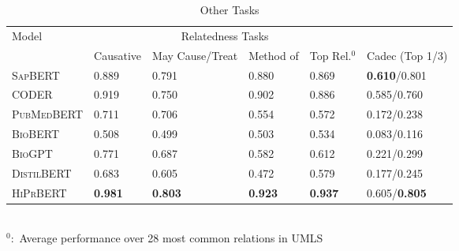 \documentclass[12pt,a4paper]{cibb}
\begin{document}
\begin{table}[h]
\centering
\caption{Other Tasks}
\label{table:auc2}
\begin{tabular}{llllll}
Model & \multicolumn{4}{c}{Relatedness Tasks} & \\
\cline{2-5}
& Causative & May Cause/Treat & Method of & Top Rel.$^0$ & Cadec (Top 1/3) \\
\hline
\textsc{SapBERT} & 0.889 & 0.791 & 0.880 & 0.869 & \textbf{0.610}/0.801 \\
\textsc{CODER} & 0.919 & 0.750 & 0.902 & 0.886 & 0.585/0.760 \\
\textsc{PubMedBERT} & 0.711 & 0.706 & 0.554 & 0.572 & 0.172/0.238 \\
\textsc{BioBERT} & 0.508 & 0.499 & 0.503 & 0.534 & 0.083/0.116 \\
\textsc{BioGPT} & 0.771 & 0.687 & 0.582 & 0.612 & 0.221/0.299 \\
\textsc{DistilBERT} & 0.683 & 0.605 & 0.472 & 0.579 & 0.177/0.245 \\
\hline
\textsc{HiPrBERT} & \textbf{0.981} & \textbf{0.803} & \textbf{0.923} & \textbf{0.937} & 0.605/\textbf{0.805} \\
\end{tabular}
\\
\footnotesize{$^0:$ Average performance over 28 most common relations in UMLS}
\end{table}


\footnotesize

 
\normalsize
\end{document}
